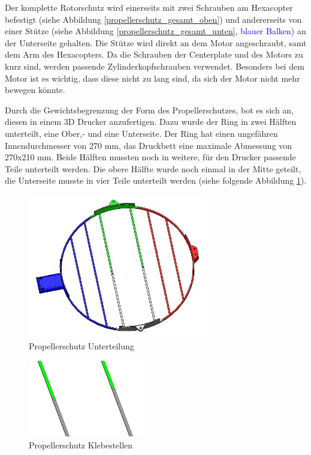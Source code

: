 	Der komplette Rotorschutz wird einerseits mit zwei Schrauben am Hexacopter befestigt (siehe Abbildung \ref{propellerschutz_gesamt_oben}) und andererseits von einer Stütze (siehe Abbildung  \ref{propellerschutz_gesamt_unten},
	\textcolor{blue}{blauer Balken}) an der Unterseite gehalten. Die Stütze wird direkt an dem Motor angeschraubt, samt dem Arm des Hexacopters.
	Da die Schrauben der Centerplate und des Motors zu kurz sind, werden passende Zylinderkopfschrauben verwendet.
	Besonders bei dem Motor ist es wichtig, dass diese nicht zu lang sind, da sich der Motor nicht mehr bewegen könnte.

	Durch die Gewichtsbegrenzung \bzw der Form des Propellerschutzes, bot es sich an, diesen in einem 3D Drucker anzufertigen.
	Dazu wurde der Ring in zwei Hälften unterteilt, eine Ober,- und eine Unterseite.
	Der Ring hat einen ungefähren Innendurchmesser von 270 mm, das Druckbett eine maximale Abmessung von 270x210 mm.
	Beide Hälften mussten noch in weitere, für den Drucker passende Teile unterteilt werden.
	Die obere Hälfte wurde noch einmal in der Mitte geteilt, die Unterseite musste in vier Teile unterteilt werden (siehe folgende Abbildung \ref{propellerschutz_mitte_unterteilung}).

			\begin{figure}[tbh]
			\begin{centering}
			\includegraphics[width = 0.7\textwidth]{Bilder/propellerschutz_mitte_unterteilung}
			\par\end{centering}
			\caption{Propellerschutz Unterteilung}
			\label{propellerschutz_mitte_unterteilung}
			\end{figure}

			\begin{figure}[H]
			\begin{centering}
			\includegraphics[width = 0.45\textwidth]{Bilder/propellerschutz_klebestellen}
			\par\end{centering}
			\caption{Propellerschutz Klebestellen}
			\label{propellerschutz_klebestellen}
			\end{figure}

